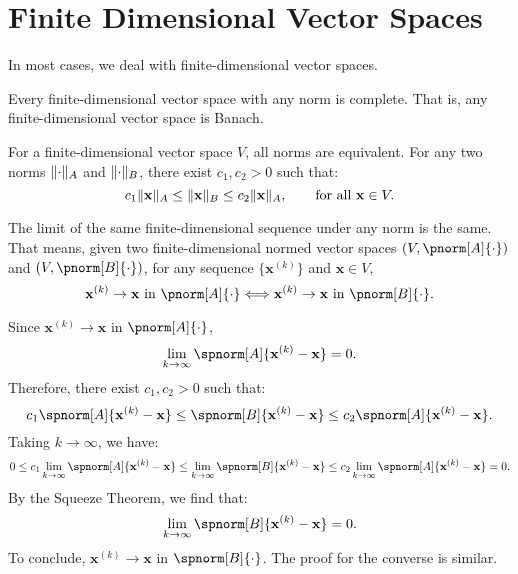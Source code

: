 \documentclass{huhtakm-template-book-v2}
\begin{document}
\section{Finite Dimensional Vector Spaces}
    In most cases, we deal with finite-dimensional vector spaces.
    \begin{rem}
        Every finite-dimensional vector space with any norm is complete. That is, any finite-dimensional vector space is Banach.
    \end{rem}
    \begin{rem}
        For a finite-dimensional vector space $V$, all norms are equivalent. For any two norms $\lVert{\cdot}\rVert_{A}$ and $\lVert{\cdot}\rVert_{B}$, there exist $c_{1}, c_{2} > 0$ such that:
        \begin{equation*}
            c_{1}\lVert{\mathbf{x}}\rVert_{A} \leq \lVert{\mathbf{x}}\rVert_{B} \leq c_{2}\lVert{\mathbf{x}}\rVert_{A}, \qquad \text{for all } \mathbf{x} \in V.
        \end{equation*}
    \end{rem}
    \begin{thm}
        The limit of the same finite-dimensional sequence under any norm is the same. That means, given two finite-dimensional normed vector spaces $(V, \pnorm[A]{\cdot})$ and $(V, \pnorm[B]{\cdot})$, for any sequence $\{\mathbf{x}^{(k)}\}$ and $\mathbf{x} \in V$,
        \begin{equation*}
            \mathbf{x}^{(k)} \to \mathbf{x} \ \text{in} \ \pnorm[A]{\cdot} \Longleftrightarrow \mathbf{x}^{(k)} \to \mathbf{x} \ \text{in} \ \pnorm[B]{\cdot}.
        \end{equation*}
    \end{thm}
    \begin{proofing}
        Since $\mathbf{x}^{(k)} \to \mathbf{x}$ in $\pnorm[A]{\cdot}$,
        \begin{equation*}
            \lim_{k \to \infty}\spnorm[A]{\mathbf{x}^{(k)} - \mathbf{x}} = 0.
        \end{equation*}
        Therefore, there exist $c_{1}, c_{2} > 0$ such that:
        \begin{equation*}
            c_{1}\spnorm[A]{\mathbf{x}^{(k)} - \mathbf{x}} \leq \spnorm[B]{\mathbf{x}^{(k)} - \mathbf{x}} \leq c_{2}\spnorm[A]{\mathbf{x}^{(k)} - \mathbf{x}}.
        \end{equation*}
        Taking $k \to \infty$, we have:
        \begin{equation*}
            0 \leq c_{1}\lim_{k \to \infty}\spnorm[A]{\mathbf{x}^{(k)} - \mathbf{x}} \leq \lim_{k \to \infty}\spnorm[B]{\mathbf{x}^{(k)} - \mathbf{x}} \leq c_{2}\lim_{k \to \infty}\spnorm[A]{\mathbf{x}^{(k)} - \mathbf{x}} = 0.
        \end{equation*}
        By the Squeeze Theorem, we find that:
        \begin{equation*}
            \lim_{k \to \infty}\spnorm[B]{\mathbf{x}^{(k)} - \mathbf{x}} = 0.
        \end{equation*}
        To conclude, $\mathbf{x}^{(k)} \to \mathbf{x}$ in $\spnorm[B]{\cdot}$. The proof for the converse is similar.
    \end{proofing}
\end{document}
